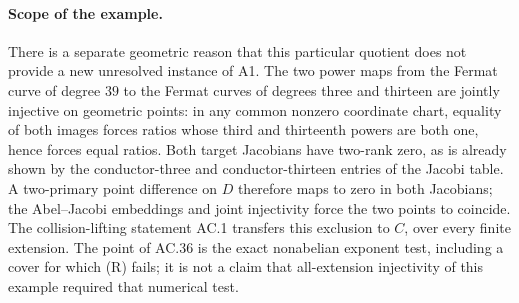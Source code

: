 \paragraph{Scope of the example.}
There is a separate geometric reason that this particular
quotient does not provide a new unresolved instance of A1.
The two power maps from the Fermat curve of degree \(39\)
to the Fermat curves of degrees three and thirteen are
jointly injective on geometric points: in any common
nonzero coordinate chart, equality of both images forces
ratios whose third and thirteenth powers are both one,
hence forces equal ratios. Both target Jacobians have
two-rank zero, as is already shown by the conductor-three
and conductor-thirteen entries of the Jacobi table.
A two-primary point difference on \(D\) therefore maps
to zero in both Jacobians; the Abel--Jacobi embeddings
and joint injectivity force the two points to coincide.
The collision-lifting statement AC.1 transfers this
exclusion to \(C\), over every finite extension. The
point of AC.36 is the exact nonabelian exponent test,
including a cover for which (R) fails; it is not a claim
that all-extension injectivity of this example required
that numerical test.

